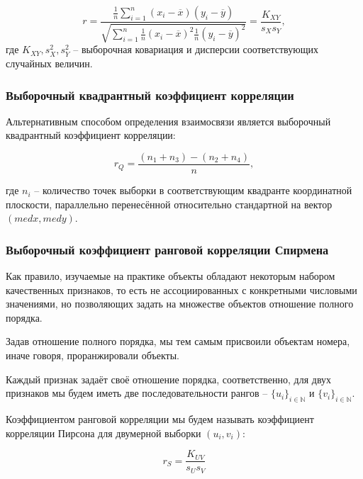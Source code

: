\begin{equation}\label{eq:pearson}
	r = \frac{\frac{1}{n} \displaystyle \sum_{i=1}^{n}{\left(x_i - \overline{x}\right)\left(y_i - \overline{y}\right)}}{\sqrt{\displaystyle \sum_{i=1}^{n}{\frac{1}{n}\left(x_i - \overline{x}\right)^2\frac{1}{n}\left(y_i - \overline{y}\right)^2}}} = \frac{K_{XY}}{s_X s_Y},
\end{equation}
где $K_{XY}, s_X^2, s_Y^2$ -- выборочная ковариация и дисперсии соответствующих случайных величин.

\subsubsection{Выборочный квадрантный коэффициент корреляции}
Альтернативным способом определения взаимосвязи является выборочный квадрантный коэффициент корреляции:

\begin{equation}\label{eq:rq}
	r_Q=\frac{(n_1 + n_3) - (n_2 + n_4)}{n},
\end{equation}

где $n_i$ -- количество точек выборки в соответствующим квадранте координатной плоскости, параллельно перенесённой относительно стандартной на вектор $(med x, med y)$.

\subsubsection{Выборочный коэффициент ранговой корреляции Спирмена}

Как правило, изучаемые на практике объекты обладают некоторым набором качественных признаков, то есть не ассоциированных с конкретными числовыми значениями, но позволяющих задать на множестве объектов отношение полного порядка.

Задав отношение полного порядка, мы тем самым присвоили объектам номера, иначе говоря, проранжировали объекты.

Каждый признак задаёт своё отношение порядка, соответственно, для двух признаков мы будем иметь две последовательности рангов -- $\{u_i\}_{i \in \mathbb{N}}$ и $\{v_i\}_{i \in \mathbb{N}}$.

Коэффициентом ранговой корреляции мы будем называть коэффициент корреляции Пирсона для двумерной выборки $(u_i, v_i)$:

\begin{equation}\label{eq:spearman}
	r_S = \frac{K_{UV}}{s_U s_V}
\end{equation}

